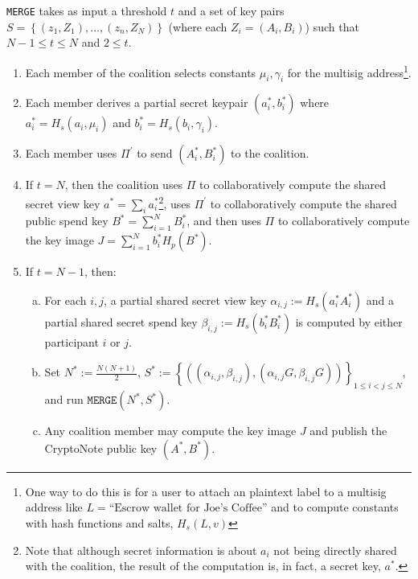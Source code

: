 \documentclass[12pt,english,oneside]{mrl}
\theoremstyle{definition}
\numberwithin{equation}{section}
\numberwithin{figure}{section}
\numberwithin{equation}{section}
\numberwithin{equation}{section}
\numberwithin{figure}{section}
\begin{document}
\texttt{MERGE} takes as input a threshold $t$ and a set of key pairs $S=\left\{(z_1,Z_1), \ldots, (z_n,Z_N)\right\}$ (where each $Z_i = (A_i,B_i)$) such that $N-1 \leq t \leq N$ and $2 \leq t$. 
\begin{enumerate}[(1)]
\item Each member of the coalition selects constants $\mu_i, \gamma_i$ for the multisig address\footnote{One way to do this is for a user to attach an plaintext label to a multisig address like $L=\text{``Escrow wallet for Joe's Coffee''}$ and to compute constants with hash functions and salts, $H_s(L, v)$}. 
\item Each member derives a partial secret keypair $(a^*_i, b^*_i)$ where $a^*_i = H_s(a_i, \mu_i)$ and $b^*_i = H_s(b_i, \gamma_i)$. 
\item Each member uses $\Pi^{\prime}$ to send $(A^*_i, B^*_i)$ to the coalition.
\item If $t=N$, then the coalition uses $\Pi$ to collaboratively compute the shared secret view key $a^* = \sum_i a^*_i$\footnote{Note that although secret information is about $a_i$ not being directly shared with the coalition, the result of the computation is, in fact, a secret key, $a^*$.}, uses $\Pi^{\prime}$ to collaboratively compute the shared public spend key $B^* = \sum_{i=1}^{N} B^*_i$, and then uses $\Pi$ to collaboratively compute the key image $J = \sum_{i=1}^{N} b^*_i H_p(B^*)$.
\item If $t=N-1$, then:
\begin{enumerate}[(a)]
\item For each $i,j$, a partial shared secret view key $\alpha_{i,j} := H_s(a^*_iA^*_i)$ and a partial shared secret spend key $\beta_{i,j} := H_s(b^*_iB^*_i)$ is computed by either participant $i$ or $j$.
\item Set $N^* := \frac{N(N+1)}{2}$, $S^* := \left\{((\alpha_{i,j},\beta_{i,j}), (\alpha_{i,j}G, \beta_{i,j}G))\right\}_{1 \leq i < j \leq N}$, and run $\texttt{MERGE}(N^*, S^*)$.
\item Any coalition member may compute the key image $J$ and publish the CryptoNote public key $(A^*, B^*)$.
\end{enumerate}
\end{enumerate}
\end{document}
